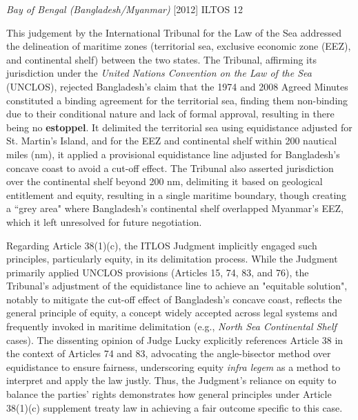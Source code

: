 \begin{casedetails}{\textit{Bay of Bengal (Bangladesh/Myanmar)} [2012] ILTOS 12}\label{case:Bangladesh v Myanmar}
    \flushleft

    This judgement by the International Tribunal for the Law of the Sea addressed the delineation of maritime zones (territorial sea, exclusive economic zone (EEZ), and continental shelf) between the two states. The Tribunal, affirming its jurisdiction under the \textit{United Nations Convention on the Law of the Sea} (UNCLOS), rejected Bangladesh's claim that the 1974 and 2008 Agreed Minutes constituted a binding agreement for the territorial sea, finding them non-binding due to their conditional nature and lack of formal approval, resulting in there being no \textbf{estoppel}. It delimited the territorial sea using equidistance adjusted for St. Martin's Island, and for the EEZ and continental shelf within 200 nautical miles (nm), it applied a provisional equidistance line adjusted for Bangladesh's concave coast to avoid a cut-off effect. The Tribunal also asserted jurisdiction over the continental shelf beyond 200 nm, delimiting it based on geological entitlement and equity, resulting in a single maritime boundary, though creating a ``grey area" where Bangladesh's continental shelf overlapped Myanmar's EEZ, which it left unresolved for future negotiation.

    \vspace{\baselineskip}

    Regarding Article 38(1)(c), the ITLOS Judgment implicitly engaged such principles, particularly equity, in its delimitation process. While the Judgment primarily applied UNCLOS provisions (Articles 15, 74, 83, and 76), the Tribunal's adjustment of the equidistance line to achieve an "equitable solution", notably to mitigate the cut-off effect of Bangladesh's concave coast, reflects the general principle of equity, a concept widely accepted across legal systems and frequently invoked in maritime delimitation (e.g., \textit{North Sea Continental Shelf} cases). The dissenting opinion of Judge Lucky explicitly references Article 38 in the context of Articles 74 and 83, advocating the angle-bisector method over equidistance to ensure fairness, underscoring equity \textit{infra legem} as a method to interpret and apply the law justly. Thus, the Judgment's reliance on equity to balance the parties' rights demonstrates how general principles under Article 38(1)(c) supplement treaty law in achieving a fair outcome specific to this case.


\end{casedetails}
